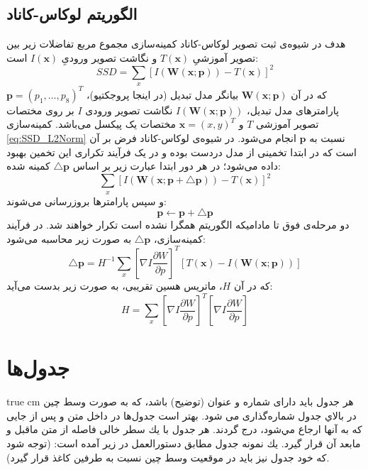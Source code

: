 \documentclass[11pt, twoside]{imsproc}
\let\LTRfootnote\footnoteA
\newcommand{\IWarp}{I(\mathbf{W}(\mathbf{x};\mathbf{p}))}
\newcommand{\warp}{\mathbf{W}(\mathbf{x};\mathbf{p})}
\newcommand{\roundB}[2]{\frac{\partial #1}{\partial #2}}
\begin{document}
\subsection{الگوریتم لوکاس-کاناد}
 هدف در شیوه‌ی ثبت تصویر لوکاس-کاناد کمینه‌سازی مجموع مربع تفاضلات زیر بین تصویر آموزشیِ $T(\mathbf{x})$ و نگاشت تصویر ورودیِ $I(\mathbf{x})$ است:
 \begin{equation}\label{eq:SSD_L2Norm}
    SSD=\sum_x[\IWarp-T(\mathbf{x})]^2
\end{equation}
که در آن $\warp$ بیانگر مدل تبدیل‌ (در اینجا پروجکتیو)، $\mathbf{p}=(p_1,\dots,p_8)^T$ پارامترهای مدل تبدیل، $\IWarp$ نگاشت تصویر ورودی $I$ بر روی مختصات تصویر آموزشی $T$ و $\mathbf{x} =(x,y)^T$ مختصات یک پیکسل می‌باشد.
 کمینه‌سازی \eqref{eq:SSD_L2Norm} نسبت به $\mathbf{p}$ انجام می‌شود. 
در شیوه‌ی لوکاس-کاناد فرض بر آن است که در ابتدا تخمینی از مدل دردست بوده و در یک فرآیند تکراری این تخمین بهبود داده می‌شود؛
در هر دور ابتدا عبارت زیر بر اساس $\triangle\mathbf{p}$ کمینه شده:
\begin{equation}\label{eq:SSD_L2Norm_deltap}
    \sum_x[I(\mathbf{W}(\mathbf{x;\mathbf{p+\triangle p}}))-T(\mathbf{x})]^2
\end{equation}
 و سپس پارامترها بروزرسانی می‌شوند:
\begin{equation}
    \mathbf{p}\leftarrow\mathbf{p+\triangle p}
\end{equation}
دو مرحله‌ی فوق تا مادامیکه الگوریتم همگرا نشده است تکرار خواهند شد. در فرآیند کمینه‌سازی، $\mathbf{\triangle p}$ به صورت زیر محاسبه می‌شود:
\begin{equation}\label{eq:deltap}
    \triangle\mathbf{p} = H^{-1} \sum_x[\nabla I\roundB{W}{p}]^T[T(\mathbf{x})-\IWarp]
\end{equation}
که در آن $H$، ماتریس هسین تقریبی\LTRfootnote{ Approximate Hessian Matrix}، به صورت زیر بدست می‌آید:
\begin{equation}\label{eq:Hessian}
    H = \sum_x[\nabla I\roundB{W}{p}]^T[\nabla I\roundB{W}{p}]
\end{equation}

\section{جدول‌ها}
 true cm
هر جدول بايد دارای شماره و عنوان (توضيح) باشد، كه به صورت وسط چين در بالاي جدول  شماره‌گذاری می شود. بهتر است جدول‌ها در داخل متن و پس از جايی كه به آنها ارجاع مي‌شود، درج گردند.  هر جدول با يك سطر خالی فاصله از متن ماقبل و مابعد آن قرار گيرد. يك نمونه جدول مطابق دستورالعمل در زير آمده است: (توجه شود كه خود جدول نيز بايد در موقعيت وسط چين نسبت به طرفين كاغذ قرار گيرد).
\\
\end{document}
